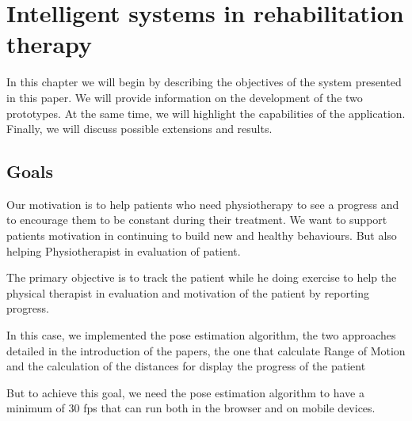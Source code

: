 
\chapter{Intelligent systems in rehabilitation therapy}




In this chapter we will begin by describing the objectives of the system presented in this paper. 
We will provide information on the development of the two prototypes. 
At the same time, we will highlight the capabilities of the application. Finally, we will discuss possible extensions and results.

\section{Goals}

\par Our motivation is to help patients who need physiotherapy to see a progress and to encourage them to be 
constant during their treatment. We want to support patients motivation in continuing to build new and 
 healthy behaviours. But also helping Physiotherapist in evaluation of patient.

The primary objective is to track the patient while he doing exercise to help 
the physical therapist in evaluation and  motivation of the patient by reporting progress.


In this case, we implemented the pose estimation algorithm, 
the two approaches detailed in the introduction of the papers, 
the one that calculate Range of Motion  and the calculation of the distances for display the progress of the patient

But to achieve this goal, 
we need the pose estimation algorithm to have a minimum of 30 fps that can run both in the browser and on mobile devices.


